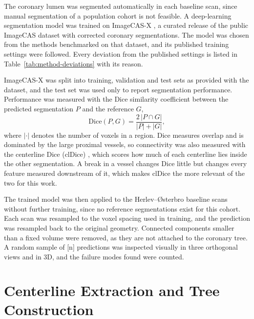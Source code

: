 The coronary lumen was segmented automatically in each baseline scan, since manual segmentation of
a population cohort is not feasible.
A deep-learning segmentation model was trained on ImageCAS-X \cite{bransby2026imagecasx}, a
curated release of the public ImageCAS dataset \cite{zeng2023imagecas} with corrected coronary
segmentations.
The model was chosen from the methods benchmarked on that dataset, and its published training
settings were followed.
Every deviation from the published settings is listed in Table~\ref{tab:method-deviations} with
its reason.

ImageCAS-X was split into training, validation and test sets as provided with the dataset, and the
test set was used only to report segmentation performance.
Performance was measured with the Dice similarity coefficient between the predicted segmentation
$P$ and the reference $G$,
\begin{equation}
  \mathrm{Dice}(P, G) = \frac{2\,|P \cap G|}{|P| + |G|},
  \label{eq:method-dice}
\end{equation}
where $|\cdot|$ denotes the number of voxels in a region.
Dice measures overlap and is dominated by the large proximal vessels, so connectivity was also
measured with the centerline Dice (clDice) \cite{shit2021cldice}, which scores how much of each
centerline lies inside the other segmentation.
A break in a vessel changes Dice little but changes every feature measured downstream of it, which
makes clDice the more relevant of the two for this work.

The trained model was then applied to the Herlev--{\O}sterbro baseline scans without further
training, since no reference segmentations exist for this cohort.
Each scan was resampled to the voxel spacing used in training, and the prediction was resampled
back to the original geometry.
Connected components smaller than a fixed volume were removed, as they are not attached to the
coronary tree.
A random sample of [n] predictions was inspected visually in three orthogonal views and in 3D,
and the failure modes found were counted.


\section{Centerline Extraction and Tree Construction}
\label{sec:method-tree}

